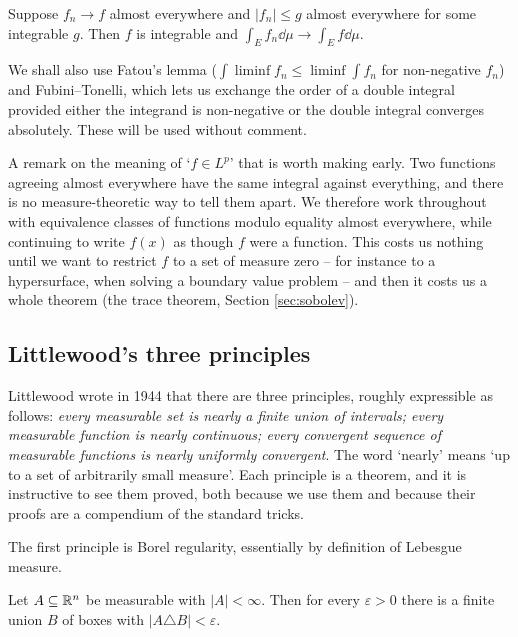 \documentclass[a4paper]{scrartcl}
\begin{document}
\begin{theorem}\label{aof-thm:dct}
	Suppose $f_n \to f$ almost everywhere and $|f_n| \le g$ almost everywhere for some integrable $g$. Then $f$ is integrable and $\int_E f_n \dd \mu \to \int_E f \dd \mu$.
\end{theorem}

We shall also use Fatou's lemma ($\int \liminf f_n \le \liminf \int f_n$ for non-negative $f_n$) and Fubini--Tonelli, which lets us exchange the order of a double integral provided either the integrand is non-negative or the double integral converges absolutely. These will be used without comment.

\begin{remark}
	A remark on the meaning of `$f \in L^p$' that is worth making early. Two functions agreeing almost everywhere have the same integral against everything, and there is no measure-theoretic way to tell them apart. We therefore work throughout with equivalence classes of functions modulo equality almost everywhere, while continuing to write $f(x)$ as though $f$ were a function. This costs us nothing until we want to restrict $f$ to a set of measure zero -- for instance to a hypersurface, when solving a boundary value problem -- and then it costs us a whole theorem (the trace theorem, Section \ref{sec:sobolev}).
\end{remark}

\subsection{Littlewood's three principles}

Littlewood wrote in 1944 that there are three principles, roughly expressible as follows: \emph{every measurable set is nearly a finite union of intervals; every measurable function is nearly continuous; every convergent sequence of measurable functions is nearly uniformly convergent}. The word `nearly' means `up to a set of arbitrarily small measure'. Each principle is a theorem, and it is instructive to see them proved, both because we use them and because their proofs are a compendium of the standard tricks.

The first principle is Borel regularity, essentially by definition of Lebesgue measure.

\begin{proposition}\label{prop:littlewood1}
	Let $A \subseteq \mathbb{R}^n$ be measurable with $|A| < \infty$. Then for every $\varepsilon > 0$ there is a finite union $B$ of boxes with $|A \triangle B| < \varepsilon$.
\end{proposition}
\end{document}

